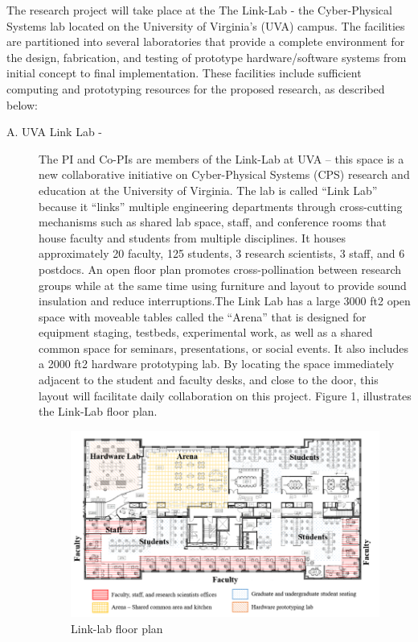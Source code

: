 The research project will take place at the The Link-Lab - the Cyber-Physical Systems lab located on the University of Virginia’s (UVA) campus. The facilities are partitioned into several laboratories that provide a complete environment for the design, fabrication, and testing of prototype hardware/software systems from initial concept to final implementation. These facilities include sufficient computing and prototyping resources for the proposed research, as described below: 

\begin{description}

\item[A. UVA Link Lab -]

The PI and Co-PIs are members of the Link-Lab at UVA – this space is a new collaborative initiative on Cyber-Physical Systems (CPS) research and education at the University of Virginia. The lab is called “Link Lab” because it “links” multiple engineering departments through cross-cutting mechanisms such as shared lab space, staff, and conference rooms that house faculty and students from multiple disciplines. It houses approximately 20 faculty, 125 students, 3 research scientists, 3 staff, and 6 postdocs. An open ﬂoor plan promotes cross-pollination between research groups while at the same time using furniture and layout to provide sound insulation and reduce interruptions.The Link Lab has a large 3000 ft2 open space with moveable tables called the “Arena” that is designed for equipment staging, testbeds, experimental work, as well as a shared common space for seminars, presentations, or social events. It also includes a 2000 ft2 hardware prototyping lab. By locating the space immediately adjacent to the student and faculty desks, and close to the door, this layout will facilitate daily collaboration on this project. Figure 1, illustrates the Link-Lab floor plan. 

\begin{figure}[h!]
    \centering
    \includegraphics[width = 0.6\linewidth]{figures/linklab.png}
    \caption{Link-lab floor plan}
    \label{fig:floor_plan}
\end{figure}


\end{description}
